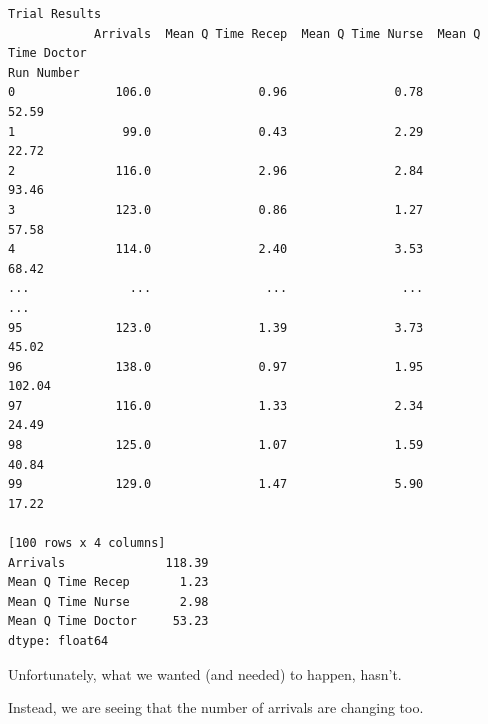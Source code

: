 \documentclass[
  letterpaper,
  DIV=11,
  numbers=noendperiod]{scrreprt}
\begin{document}
\begin{verbatim}
Trial Results
            Arrivals  Mean Q Time Recep  Mean Q Time Nurse  Mean Q Time Doctor
Run Number                                                                    
0              106.0               0.96               0.78               52.59
1               99.0               0.43               2.29               22.72
2              116.0               2.96               2.84               93.46
3              123.0               0.86               1.27               57.58
4              114.0               2.40               3.53               68.42
...              ...                ...                ...                 ...
95             123.0               1.39               3.73               45.02
96             138.0               0.97               1.95              102.04
97             116.0               1.33               2.34               24.49
98             125.0               1.07               1.59               40.84
99             129.0               1.47               5.90               17.22

[100 rows x 4 columns]
Arrivals              118.39
Mean Q Time Recep       1.23
Mean Q Time Nurse       2.98
Mean Q Time Doctor     53.23
dtype: float64
\end{verbatim}

Unfortunately, what we wanted (and needed) to happen, hasn't.

Instead, we are seeing that the number of arrivals are changing too.
\end{document}
